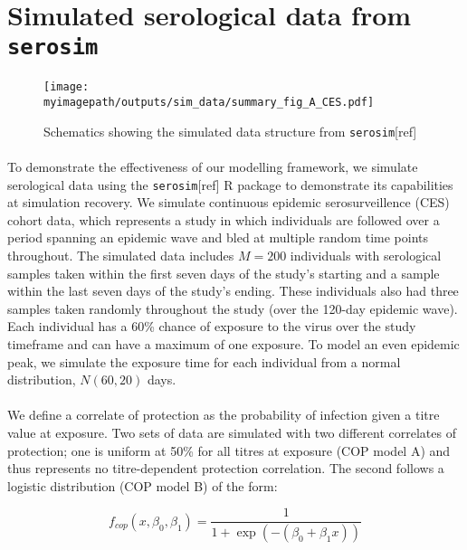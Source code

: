 \section{Simulated serological data from \texttt{serosim}}

\begin{figure}[h]
    \centering
    \texttt{[image: \\myimagepath/outputs/sim\_data/summary\_fig\_A\_CES.pdf]}     \caption{Schematics showing the simulated data structure from \texttt{serosim}[ref]}
    \label{fig:sim_A}
\end{figure}

\paragraph{}To demonstrate the effectiveness of our modelling framework, we simulate serological data using the \texttt{serosim}[ref] R package to demonstrate its capabilities at simulation recovery. We simulate continuous epidemic serosurveillence (CES) cohort data, which represents a study in which individuals are followed over a period spanning an epidemic wave and bled at multiple random time points throughout. The simulated data includes $ M = 200$ individuals with serological samples taken within the first seven days of the study's starting and a sample within the last seven days of the study's ending. These individuals also had three samples taken randomly throughout the study (over the 120-day epidemic wave). Each individual has a 60\% chance of exposure to the virus over the study timeframe and can have a maximum of one exposure. To model an even epidemic peak, we simulate the exposure time for each individual from a normal distribution, $N(60, 20)$ days.%

\paragraph{}We define a correlate of protection as the probability of infection given a titre value at exposure. Two sets of data are simulated with two different correlates of protection; one is uniform at 50\% for all titres at exposure (COP model A) and thus represents no titre-dependent protection correlation. The second follows a logistic distribution (COP model B) of the form:

\begin{equation}
\label{eq_cop}
f_{cop}(x, \beta_0, \beta_1) = \frac{1}{1 + \exp(- (\beta_0 + \beta_1x))}
\end{equation}

